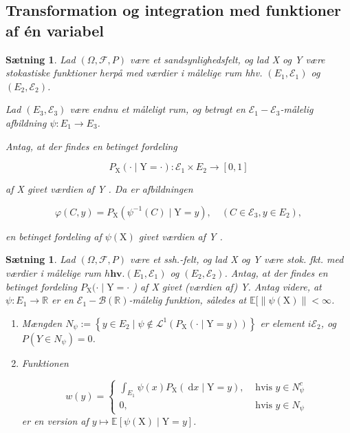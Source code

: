 \documentclass{article}
\newcommand{\1}{\mathbbm{1}}
\theoremstyle{boxed}
\newtheorem{proposition}[theorem]{Sætning}
\begin{document}
\subsection{Transformation og integration med funktioner af én variabel}
\begin{theorem-box}
    \begin{proposition}
        Lad $(\Omega, \mathcal{F}, P)$ være et sandsynlighedsfelt, og lad X og Y være stokastiske funktioner herpå med værdier i målelige rum hhv. $\left(E_1, \mathcal{E}_1\right)$ og $\left(E_2, \mathcal{E}_2\right)$.

Lad $\left(E_3, \mathcal{E}_3\right)$ være endnu et måleligt rum, og betragt en $\mathcal{E}_1-\mathcal{E}_3$-målelig afbildning $\psi: E_1 \rightarrow E_3$.

Antag, at der findes en betinget fordeling

$$
P_{\mathrm{X}}(\cdot \mid \mathrm{Y}=\cdot): \mathcal{E}_1 \times E_2 \rightarrow[0,1]
$$

af X givet værdien af Y . Da er afbildningen

$$
\varphi(C, y)=P_{\mathrm{X}}\left(\psi^{-1}(C) \mid \mathrm{Y}=y\right), \quad\left(C \in \mathcal{E}_3, y \in E_2\right),
$$

en betinget fordeling af $\psi(\mathrm{X})$ givet værdien af Y .
    \end{proposition}
\end{theorem-box}
\begin{theorem-box}
    \begin{proposition}
        Lad $(\Omega, \mathcal{F}, P)$ være et ssh.-felt, og lad X og Y være stok. fkt. med værdier i målelige rum $h \boldsymbol{h} \boldsymbol{v} .\left(E_1, \mathcal{E}_1\right)$ og $\left(E_2, \mathcal{E}_2\right)$.
Antag, at der findes en betinget fordeling $P_{\mathrm{X}}(\cdot \mid \mathrm{Y}=\cdot$ ) af X givet (værdien af) Y.
Antag videre, at $\psi: E_1 \rightarrow \mathbb{R}$ er en $\mathcal{E}_1-\mathcal{B}(\mathbb{R})$-målelig funktion, således at $\mathbb{E}[\|\psi(\mathrm{X})\|<\infty$.
\begin{enumerate}
    \item[\textnormal{(i)}] Mængden $N_\psi:=\left\{y \in E_2 \mid \psi \notin \mathcal{L}^1\left(P_{\mathrm{X}}(\cdot \mid \mathrm{Y}=y)\right)\right\}$ er element $i \mathcal{E}_2$, og $P\left(Y \in N_\psi\right)=0$.
    \item[\textnormal{(ii)}]Funktionen

$$
w(y)= \begin{cases}\int_{E_1} \psi(x) P_{\mathrm{X}}(\mathrm{~d} x \mid \mathrm{Y}=y), & \text { hvis } y \in N_\psi^c \\ 0, & \text { hvis } y \in N_\psi\end{cases}
$$
er en version af $y \mapsto \mathbb{E}[\psi(\mathrm{X}) \mid \mathrm{Y}=y]$.
\end{enumerate}
    \end{proposition}
\end{theorem-box}
\end{document}
